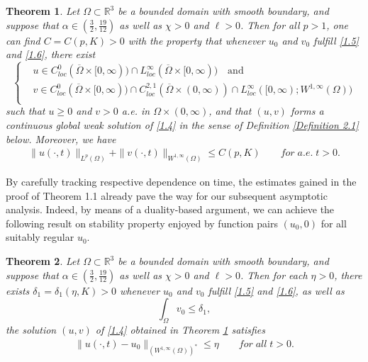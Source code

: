 \documentclass[12pt]{article}
\theoremstyle{plain}
\newtheorem{theorem}{Theorem}[section]
\theoremstyle{definition}
\numberwithin{equation}{section}
\begin{document}
\begin{theorem}\label{Th1.1}
Let $\Omega \subset \mathbb R^3$ be a bounded domain with smooth boundary, and suppose that $\alpha \in \left( \frac{3}{2}, \frac{19}{12} \right)$ as well as
$\chi >0$ and $\ell>0$. Then for all $p>1$, one can find $C=C(p,K)>0$ with the property that whenever $u_0$ and $v_0$ fulfill
\eqref{1.5} and \eqref{1.6},
there exist
\begin{equation}\label{1.8}
\left\{
\begin{aligned}
&u\in C^{0}_{loc}(\overline{\Omega}\times [0,\infty))\cap L^{\infty}_{loc}(\overline{\Omega}\times [0,\infty)) \quad \text{and} \\
&v\in C^{0}_{loc}(\overline{\Omega}\times [0,\infty))\cap C^{2,1}_{loc}(\overline{\Omega}\times (0,\infty))\cap L^{\infty}_{loc}([0,\infty);W^{1,\infty}(\Omega))\\
\end{aligned}
\right.
\end{equation}
such that  $u\geq 0$ and $v>0$ a.e. in $\Omega\times(0,\infty)$, and that
$(u,v)$ forms a continuous global weak solution of \eqref{1.4} in the sense of Definition \ref{Definition 2.1} below. Moreover, we have
\begin{align}\label{1.9}
    \|u(\cdot,t)\|_{L^{p}(\Omega)}+\|v(\cdot,t)\|_{W^{1,\infty}(\Omega)}\leq C(p,K)\qquad for \;a.e.\; t>0.
\end{align}
\end{theorem}
By carefully tracking respective dependence on time, the estimates gained in the
proof of Theorem 1.1 already pave the way
for our subsequent asymptotic analysis. Indeed, by means of a duality-based argument, we can achieve
the following result on stability property enjoyed by function pairs $(u_0,0)$ for all suitably regular  $u_0$.  %
\begin{theorem}\label{Th1.2}
Let $\Omega \subset \mathbb R^3$ be a bounded domain with smooth boundary, and suppose that $\alpha \in \left( \frac{3}{2}, \frac{19}{12} \right)$ as well as
$\chi >0$ and $\ell>0$. Then for each $\eta>0$, there exists $\delta_1=\delta_1(\eta, K)>0$ whenever $u_0$ and $v_0$ fulfill
\eqref{1.5} and \eqref{1.6}, as well as
$$\int_{\Omega}v_0\leq \delta_1,$$
the solution $(u,v)$ of \eqref{1.4} obtained in Theorem \ref{Th1.1} satisfies
\begin{align}\label{1.11-1}
    \|u(\cdot,t)-u_0\|_{(W^{1,\infty}(\Omega))^*}\leq \eta\qquad for \;all\; t>0.
\end{align}
\end{theorem}
\end{document}
